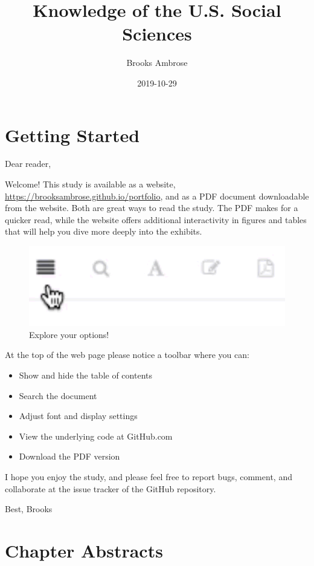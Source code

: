 \documentclass[]{book}
\title{Knowledge of the U.S. Social Sciences}
\author{Brooks Ambrose}
\date{2019-10-29}
\providecommand{\tightlist}{%
  \setlength{\itemsep}{0pt}\setlength{\parskip}{0pt}}
\theoremstyle{definition}
\theoremstyle{definition}
\theoremstyle{definition}
\theoremstyle{remark}
\begin{document}
\maketitle

{
\setcounter{tocdepth}{2}
\tableofcontents
}
\listoftables
\listoffigures
\hypertarget{getting-started}{%
\chapter*{Getting Started}\label{getting-started}}


Dear reader,

Welcome! This study is available as a website,
\url{https://brooksambrose.github.io/portfolio}, and as a PDF document
downloadable from the website. Both are great ways to read the study.
The PDF makes for a quicker read, while the website offers additional
interactivity in figures and tables that will help you dive more deeply
into the exhibits.

\begin{figure}

{\centering \includegraphics[width=0.3\linewidth]{img/toolbar} 

}

\caption{Explore your options!}\label{fig:toolbar}
\end{figure}

At the top of the web page please notice a toolbar where you can:

\begin{itemize}
\tightlist
\item
  Show and hide the table of contents
\item
  Search the document
\item
  Adjust font and display settings
\item
  View the underlying code at GitHub.com
\item
  Download the PDF version
\end{itemize}

I hope you enjoy the study, and please feel free to report bugs,
comment, and collaborate at the issue tracker of the GitHub repository.

Best, Brooks

\hypertarget{chapter-abstracts}{%
\chapter*{Chapter Abstracts}\label{chapter-abstracts}}
\end{document}
